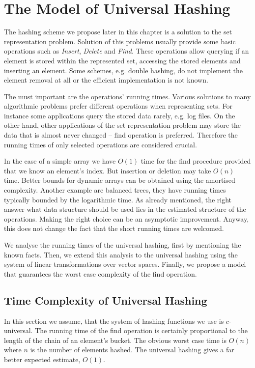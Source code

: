 \chapter{The Model of Universal Hashing}
\label{chapter-proposed-model}

The hashing scheme we propose later in this chapter is a solution to the set representation problem. Solution of this problems usually provide some basic operations such as \emph{Insert}, \emph{Delete} and \emph{Find}. These operations allow querying if an element is stored within the represented set, accessing the stored elements and inserting an element. Some schemes, e.g. double hashing, do not implement the element removal at all or the efficient implementation is not known.

The must important are the operations' running times. Various solutions to many algorithmic problems prefer different operations when representing sets. For instance some applications query the stored data rarely, e.g. log files. On the other hand, other applications of the set representation problem may store the data that is almost never changed -- find operation is preferred. Therefore the running times of only selected operations are considered crucial. 

In the case of a simple array we have $O(1)$ time for the find procedure provided that we know an element's index. But insertion or deletion may take $O(n)$ time. Better bounds for dynamic arrays can be obtained using the amortised complexity. Another example are balanced trees, they have running times typically bounded by the logarithmic time. As already mentioned, the right answer what data structure should be used lies in the estimated structure of the operations. Making the right choice can be an asymptotic improvement. Anyway, this does not change the fact that the short running times are welcomed.

We analyse the running times of the universal hashing, first by mentioning the known facts. Then, we extend this analysis to the universal hashing using the system of linear transformations over vector spaces. Finally, we propose a model that guarantees the worst case complexity of the find operation.

\section{Time Complexity of Universal Hashing}
In this section we assume, that the system of hashing functions we use is $c$-universal. The running time of the find operation is certainly proportional to the length of the chain of an element's bucket. The obvious worst case time is $O(n)$ where $n$ is the number of elements hashed. The universal hashing gives a far better expected estimate, $O(1)$.

